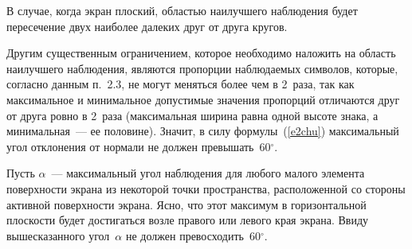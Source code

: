 \begin{multicols}{2}
В случае, когда экран плоский, областью наилучшего наблюдения будет 
пересечение двух наиболее далеких друг от друга кругов.

     Другим существенным ограничением, которое необходимо наложить 
на область наилучшего наблюдения, являются пропорции наблюдаемых 
символов, которые, согласно данным п.~2.3, не могут меняться более чем в 2~раза, 
так как максимальное и минимальное допустимые значения пропорций 
отличаются друг от друга ровно в  2~раза (максимальная ширина равна 
одной высоте знака, а минимальная~--- ее половине). Значит, в силу 
формулы~(\ref{e2chu}) максимальный угол отклонения от нормали не 
должен превышать~60$^\circ$.
     
     Пусть $\alpha$~--- максимальный угол наблюдения для любого малого 
элемента поверхности экрана из некоторой точки пространства, 
расположенной со стороны активной поверхности экрана. Ясно, что этот 
максимум в горизонтальной плоскости будет достигаться возле правого или 
левого края экрана. Ввиду вышесказанного угол~$\alpha$ не должен 
превосходить~60$^\circ$.

\end{multicols}

\begin{figure} %
\vspace*{1pt}
\begin{center}
\mbox{%
\epsfxsize=97.554mm
}
\end{center}
\vspace*{-6pt}
\end{figure}

\begin{figure} %
\vspace*{1pt}
\begin{center}
\mbox{%
\epsfxsize=97.554mm
}
\end{center}
\vspace*{-6pt}
\vspace*{9pt}
\end{figure}


